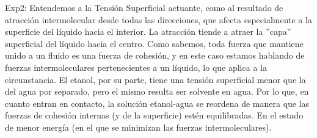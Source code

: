 \documentclass[10pt,a4paper]{article}
\begin{document}
Exp2: Entendemos a la Tensión Superficial actuante, como al resultado de atracción intermolecular desde todas las direcciones, que afecta especialmente a la superficie del líquido hacia el interior. La atracción tiende a atraer la ''capa'' superficial del líquido hacia el centro. Como sabemos, toda fuerza que mantiene unido a un fluido es una fuerza de cohesión, y en este caso estamos hablando de fuerzas intermoleculares pertenecientes a un líquido, lo que aplica a la circunstancia. 
El etanol, por su parte, tiene una tensión superficial menor que la del agua por separado, pero el mismo resulta ser solvente en agua. Por lo que, en cuanto entran en contacto, la solución etanol-agua se reordena de manera que las fuerzas de cohesión internas (y de la superficie) estén equilibradas. En el estado de menor energía (en el que se minimizan las fuerzas intermoleculares).
\end{document}
